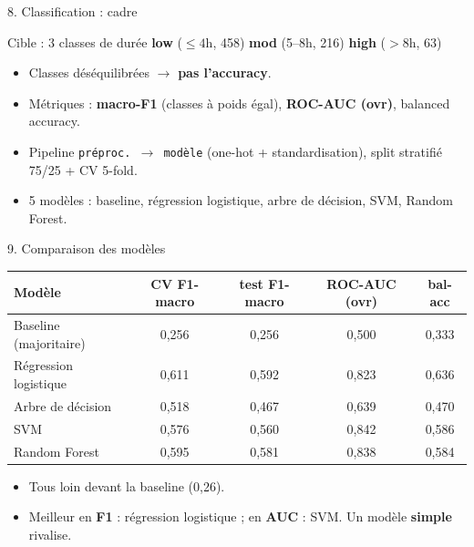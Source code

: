 \documentclass[10pt,aspectratio=169]{beamer}
\begin{document}
\begin{frame}{8. Classification : cadre}
\begin{block}{Cible : 3 classes de durée}
\textbf{low} ($\leq 4$h, 458) \quad \textbf{mod} (5--8h, 216) \quad \textbf{high} ($>8$h, 63)
\end{block}
\begin{itemize}
  \item Classes \alert{déséquilibrées} $\rightarrow$ \textbf{pas l'accuracy}.
  \item Métriques : \textbf{macro-F1} (classes à poids égal), \textbf{ROC-AUC (ovr)}, balanced accuracy.
  \item Pipeline \texttt{préproc. $\rightarrow$ modèle} (one-hot + standardisation), split stratifié 75/25 + CV 5-fold.
  \item 5 modèles : baseline, régression logistique, arbre de décision, SVM, Random Forest.
\end{itemize}
\end{frame}

\begin{frame}{9. Comparaison des modèles}
\begin{center}
\begin{tabular}{lcccc}
\toprule
Modèle & CV F1-macro & test F1-macro & ROC-AUC (ovr) & bal-acc \\ \midrule
Baseline (majoritaire)        & 0,256 & 0,256 & 0,500 & 0,333 \\
\alert{Régression logistique} & \alert{0,611} & 0,592 & 0,823 & 0,636 \\
Arbre de décision             & 0,518 & 0,467 & 0,639 & 0,470 \\
SVM                           & 0,576 & 0,560 & \alert{0,842} & 0,586 \\
Random Forest                 & 0,595 & 0,581 & 0,838 & 0,584 \\
\bottomrule
\end{tabular}
\end{center}
\begin{itemize}
  \item Tous \alert{loin devant la baseline} (0,26).
  \item Meilleur en \textbf{F1} : régression logistique ; en \textbf{AUC} : SVM. Un modèle \textbf{simple} rivalise.
\end{itemize}
\end{frame}
\end{document}
